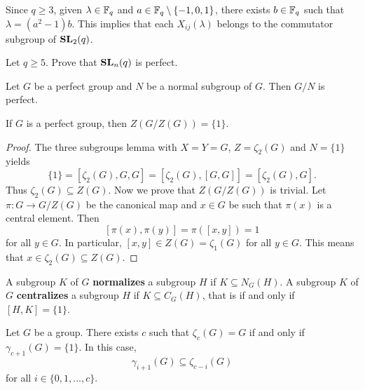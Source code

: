 Since $q\geq 3$, given $\lambda\in\mathbb{F}_q$ and $a\in\mathbb{F}_q\setminus\{-1,0,1\}$, there exists
$b\in\mathbb{F}_q$ such that $\lambda=(a^2-1)b$. This implies that each $X_{ij}(\lambda)$ belongs to the
commutator subgroup of $\mathbf{SL}_2(q)$. 


\begin{exercise}
Let $q\geq5$. 
Prove that $\mathbf{SL}_n(q)$ is perfect.  	
\end{exercise}


\begin{exercise}
Let $G$ be a perfect group and $N$ be a normal subgroup of $G$. Then $G/N$ is perfect.  	
\end{exercise}

\begin{theorem}[Gr\"un]
	\label{theorem:Grun}
	If $G$ is a perfect group, then $Z(G/Z(G))=\{1\}$. 
\end{theorem}

\begin{proof}
	The three subgroups lemma with $X=Y=G$, $Z=\zeta_2(G)$ and $N=\{1\}$ yields  
	\[
	\{1\}=[\zeta_2(G),G,G]=[\zeta_2(G),[G,G]]=[\zeta_2(G),G].
	\]
	Thus 	
	$\zeta_2(G)\subseteq Z(G)$. Now we prove that $Z(G/Z(G))$ is trivial. Let $\pi\colon G\to G/Z(G)$ be the canonical map
	and $x\in G$ be such that 
	$\pi(x)$ is a central element. Then 
	\[
	[\pi(x),\pi(y)]=\pi([x,y])=1
	\]
	for all $y\in G$. In particular, 
	$[x,y]\in Z(G)=\zeta_1(G)$ for all $y\in G$. This means that $x\in\zeta_2(G)\subseteq Z(G)$. 
\end{proof}

A subgroup $K$ of $G$ \textbf{normalizes} a subgroup 
$H$ if $K\subseteq N_G(H)$.
A subgroup $K$ of $G$ \textbf{centralizes} a subgroup 
$H$ if $K\subseteq C_G(H)$, that is if and only if $[H,K]=\{1\}$.

\begin{lemma}
	\label{lem:gamma_zeta}
	Let $G$ be a group. There exists $c$ such that $\zeta_c(G)=G$ if and only if 
	$\gamma_{c+1}(G)=\{1\}$. In this case,  
	\[
	\gamma_{i+1}(G)\subseteq\zeta_{c-i}(G)
	\]
	for all $i\in\{0,1,\dots,c\}$. 
\end{lemma}

